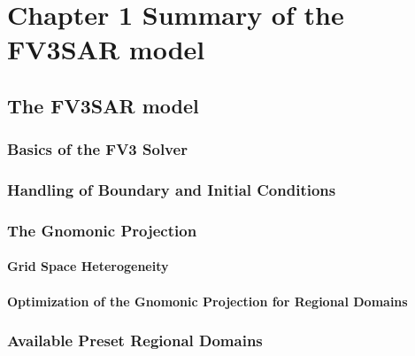 \chapter{Chapter 1 Summary of the FV3SAR model}
 
\section{The FV3SAR model}
\subsection{Basics of the FV3 Solver}
\subsection{Handling of Boundary and Initial Conditions}
\subsection{The Gnomonic Projection}
\subsubsection{Grid Space Heterogeneity}
\subsubsection{Optimization of the Gnomonic Projection for Regional Domains}
\subsection{Available Preset Regional Domains}

